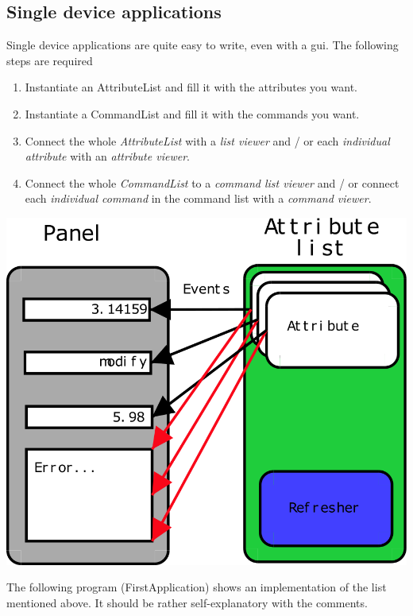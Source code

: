 \subsection{Single device applications}

Single device applications are quite easy to write, even with a gui.
The following steps are required
\begin{enumerate}
\item Instantiate an AttributeList and fill it with
the attributes you want. 
\item Instantiate a CommandList and fill it with the
commands you want. 
\item Connect the whole \emph{AttributeList} with a \emph{list viewer} and
/ or each \emph{individual attribute} with an \emph{attribute viewer}. 
\item Connect the whole \emph{CommandList} to a \emph{command list viewer}
and / or connect each \emph{individual command} in the command list
with a \emph{command viewer}. 
\end{enumerate}
\begin{center}
\includegraphics[scale=0.6]{atk/img/listpanel}
\par\end{center}

The following program (FirstApplication)
shows an implementation of the list mentioned above. It should be
rather self-explanatory with the comments.

